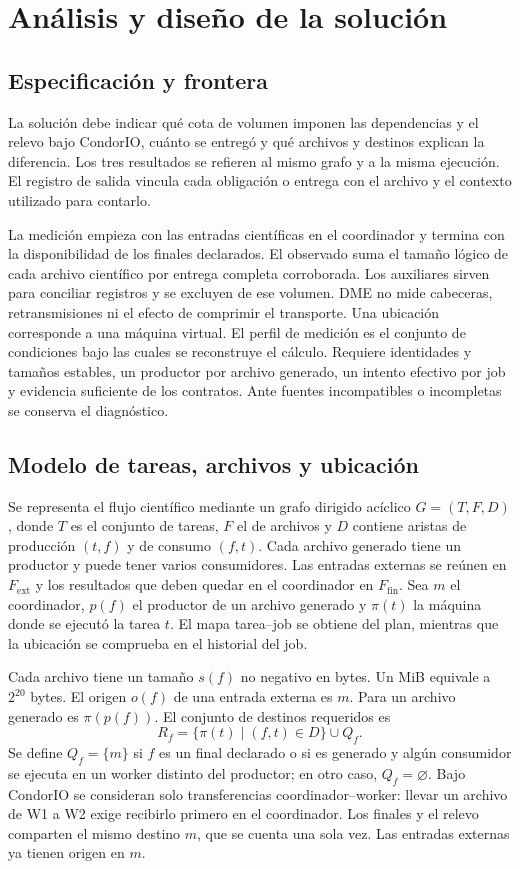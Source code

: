 \chapter{Análisis y diseño de la solución}
\label{ch:diseno}
\section{Especificación y frontera}
La solución debe indicar qué cota de volumen imponen las dependencias y el relevo bajo CondorIO, cuánto se entregó y qué archivos y destinos explican la diferencia. Los tres resultados se refieren al mismo grafo y a la misma ejecución. El registro de salida vincula cada obligación o entrega con el archivo y el contexto utilizado para contarlo.

La medición empieza con las entradas científicas en el coordinador y termina con la disponibilidad de los finales declarados. El observado suma el tamaño lógico de cada archivo científico por entrega completa corroborada. Los auxiliares sirven para conciliar registros y se excluyen de ese volumen. DME no mide cabeceras, retransmisiones ni el efecto de comprimir el transporte. Una ubicación corresponde a una máquina virtual. El perfil de medición es el conjunto de condiciones bajo las cuales se reconstruye el cálculo. Requiere identidades y tamaños estables, un productor por archivo generado, un intento efectivo por job y evidencia suficiente de los contratos. Ante fuentes incompatibles o incompletas se conserva el diagnóstico.

\section{Modelo de tareas, archivos y ubicación}
Se representa el flujo científico mediante un grafo dirigido acíclico $G=(T,F,D)$, donde $T$ es el conjunto de tareas, $F$ el de archivos y $D$ contiene aristas de producción $(t,f)$ y de consumo $(f,t)$. Cada archivo generado tiene un productor y puede tener varios consumidores. Las entradas externas se reúnen en $F_{\mathrm{ext}}$ y los resultados que deben quedar en el coordinador en $F_{\mathrm{fin}}$. Sea $m$ el coordinador, $p(f)$ el productor de un archivo generado y $\pi(t)$ la máquina donde se ejecutó la tarea $t$. El mapa tarea--job se obtiene del plan, mientras que la ubicación se comprueba en el historial del job.

Cada archivo tiene un tamaño $s(f)$ no negativo en bytes. Un MiB equivale a $2^{20}$ bytes. El origen $o(f)$ de una entrada externa es $m$. Para un archivo generado es $\pi(p(f))$. El conjunto de destinos requeridos es
\begin{equation}
R_f=\{\pi(t)\mid (f,t)\in D\}\cup Q_f.
\end{equation}
Se define $Q_f=\{m\}$ si $f$ es un final declarado o si es generado y algún consumidor se ejecuta en un worker distinto del productor; en otro caso, $Q_f=\varnothing$. Bajo CondorIO se consideran solo transferencias coordinador--worker: llevar un archivo de W1 a W2 exige recibirlo primero en el coordinador. Los finales y el relevo comparten el mismo destino $m$, que se cuenta una sola vez. Las entradas externas ya tienen origen en $m$.

